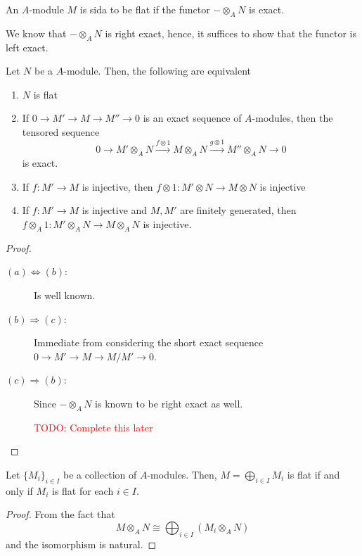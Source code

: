 \begin{definition}
    An $A$-module $M$ is sida to be flat if the functor $-\otimes_A N$ is exact.
\end{definition}

We know that $-\otimes_AN$ is right exact, hence, it suffices to show that the functor is left exact.

\begin{theorem}
    Let $N$ be a $A$-module. Then, the following are equivalent 
    \begin{enumerate}[label=(\alph*)]
        \item $N$ is flat 
        \item If $0\rightarrow M'\rightarrow M\rightarrow M''\rightarrow 0$ is an exact sequence of $A$-modules, then the tensored sequence 
        \begin{equation*}
        0\longrightarrow M'\otimes_A N\stackrel{f\otimes 1}{\longrightarrow} M\otimes_A N\stackrel{g\otimes 1}{\longrightarrow} M''\otimes_A N\longrightarrow 0
        \end{equation*}
        is exact.
        \item If $f: M'\to M$ is injective, then $f\otimes 1: M'\otimes N\to M\otimes N$ is injective 
        \item If $f: M'\to M$ is injective and $M,M'$ are finitely generated, then $f\otimes_A 1: M'\otimes_A N\to M\otimes_A N$ is injective.
    \end{enumerate}
\end{theorem}
\begin{proof}
\hfill 
\begin{description}
\item[$(a)\Longleftrightarrow(b)$:] Is well known.
\item[$(b)\Longrightarrow(c)$:] Immediate from considering the short exact sequence $0\rightarrow M'\rightarrow M\rightarrow M/M'\rightarrow0$.
\item[$(c)\Longrightarrow(b)$:] Since $-\otimes_A N$ is known to be right exact as well. 
\item[] \textcolor{red}{TODO: Complete this later}
\end{description}
\end{proof}

\begin{proposition}
    Let $\{M_i\}_{i\in I}$ be a collection of $A$-modules. Then, $M = \bigoplus\limits_{i\in I}M_i$ is flat if and only if $M_i$ is flat for each $i\in I$.
\end{proposition}
\begin{proof}
    From the fact that 
    \begin{equation*}
        M\otimes_A N\cong\bigoplus_{i\in I}(M_i\otimes_A N)
    \end{equation*}
    and the isomorphism is natural.
\end{proof}

